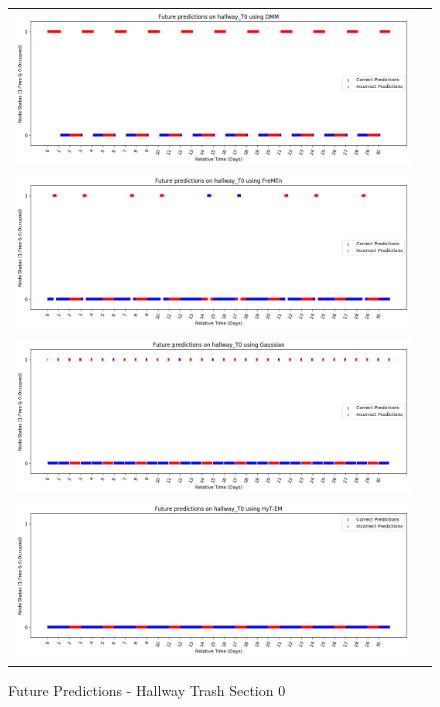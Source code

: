 \begin{center}
\begin{figure}[!Hp]
  \begin{tabular}{cc}
    {\includegraphics[width = 6in]{images/results/Future_hallway_T0_DMM.png}} \\
    {\includegraphics[width = 6in]{images/results/Future_hallway_T0_FreMEn.png}} \\
    {\includegraphics[width = 6in]{images/results/Future_hallway_T0_Gaussian.png}} \\
    {\includegraphics[width = 6in]{images/results/Future_hallway_T0_HyT-EM.png}} \\
  \end{tabular}
  \caption{Future Predictions - Hallway Trash Section 0}
\end{figure}


\end{center}
